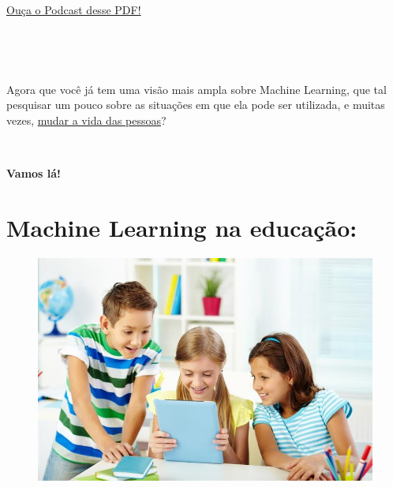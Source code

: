 \documentclass[12pt]{article}
\begin{document}
    
    \
    
    \
    
    \
    
    \
    
    \
    
    \
    
    \
    
    \

    \begin{caixa}

        \begin{center}

            \href{https://soundcloud.com/gustavo-rodrigues-468052117/ldo-machine-learning-capitulo04}{Ouça o Podcast desse PDF!}
            
        \end{center}

    \end{caixa}

    \

    \
    
    \centering Agora que você já tem uma visão mais ampla sobre Machine Learning,
que tal pesquisar um pouco sobre as situações em que ela pode ser
utilizada, e muitas vezes, \href{https://www.deal.com.br/blog/7-maneiras-de-como-a-inteligencia-artificial-esta-mudando-nosso-dia-a-dia/}{mudar a vida das pessoas}?

\

    \centering \Large{\textbf{Vamos lá!}}
    
\large
            \section*{\centering Machine Learning na educação:}\label{sec:ML_Na_Educacao}
            
            \begin{figure}[ht]
            \centering
            \includegraphics[scale=0.6]{ldo-1.jpg}               
            \end{figure}
            
\end{document}
